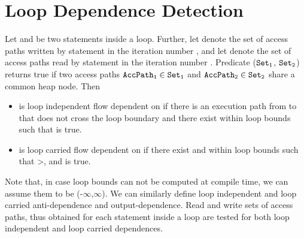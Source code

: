 \section{Loop Dependence Detection}
\label{sec:DepDetect}
Let  and  be two statements inside a loop. Further, 
let  denote the set of access paths written by statement 
 in the iteration number , and let  
denote the set of access paths read by statement  in the iteration
number . Predicate (${\tt Set}_{\tt 1}$, ${\tt Set}_{\tt 2}$) returns 
true if two access paths ${\tt AccPath}_{\tt 1}\in{\tt Set}_{\tt 1}$ and ${\tt AccPath}_{\tt 2}\in{\tt Set}_{\tt 2}$ 
share a common heap node. Then
\begin{itemize}
\item {} is loop independent flow dependent on  if there is an 
execution path from  to  that does not cross the loop boundary and there exist  
within loop bounds such that  is true.
\item {} is loop carried flow dependent on  if there exist 
 and  within loop bounds such that >, and  is true.
\end{itemize}
Note that, in case loop bounds can not be computed at compile time,
we can assume them to be (-$\infty$,$\infty$). We can similarly define 
loop independent and loop carried anti-dependence and output-dependence.
Read and write sets of access paths, thus obtained for 
each statement inside a loop are tested for both loop independent 
and loop carried dependences.
